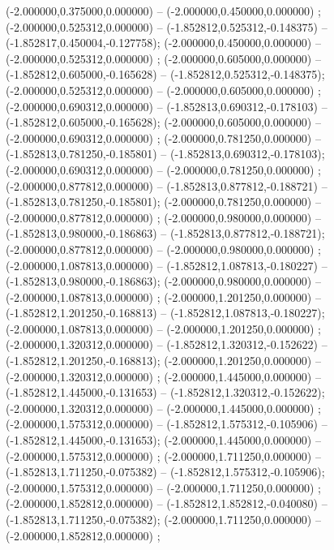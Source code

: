  (-2.000000,0.375000,0.000000) -- (-2.000000,0.450000,0.000000) ;
 (-2.000000,0.525312,0.000000) -- (-1.852812,0.525312,-0.148375) -- (-1.852817,0.450004,-0.127758);
 (-2.000000,0.450000,0.000000) -- (-2.000000,0.525312,0.000000) ;
 (-2.000000,0.605000,0.000000) -- (-1.852812,0.605000,-0.165628) -- (-1.852812,0.525312,-0.148375);
 (-2.000000,0.525312,0.000000) -- (-2.000000,0.605000,0.000000) ;
 (-2.000000,0.690312,0.000000) -- (-1.852813,0.690312,-0.178103) -- (-1.852812,0.605000,-0.165628);
 (-2.000000,0.605000,0.000000) -- (-2.000000,0.690312,0.000000) ;
 (-2.000000,0.781250,0.000000) -- (-1.852813,0.781250,-0.185801) -- (-1.852813,0.690312,-0.178103);
 (-2.000000,0.690312,0.000000) -- (-2.000000,0.781250,0.000000) ;
 (-2.000000,0.877812,0.000000) -- (-1.852813,0.877812,-0.188721) -- (-1.852813,0.781250,-0.185801);
 (-2.000000,0.781250,0.000000) -- (-2.000000,0.877812,0.000000) ;
 (-2.000000,0.980000,0.000000) -- (-1.852813,0.980000,-0.186863) -- (-1.852813,0.877812,-0.188721);
 (-2.000000,0.877812,0.000000) -- (-2.000000,0.980000,0.000000) ;
 (-2.000000,1.087813,0.000000) -- (-1.852812,1.087813,-0.180227) -- (-1.852813,0.980000,-0.186863);
 (-2.000000,0.980000,0.000000) -- (-2.000000,1.087813,0.000000) ;
 (-2.000000,1.201250,0.000000) -- (-1.852812,1.201250,-0.168813) -- (-1.852812,1.087813,-0.180227);
 (-2.000000,1.087813,0.000000) -- (-2.000000,1.201250,0.000000) ;
 (-2.000000,1.320312,0.000000) -- (-1.852812,1.320312,-0.152622) -- (-1.852812,1.201250,-0.168813);
 (-2.000000,1.201250,0.000000) -- (-2.000000,1.320312,0.000000) ;
 (-2.000000,1.445000,0.000000) -- (-1.852812,1.445000,-0.131653) -- (-1.852812,1.320312,-0.152622);
 (-2.000000,1.320312,0.000000) -- (-2.000000,1.445000,0.000000) ;
 (-2.000000,1.575312,0.000000) -- (-1.852812,1.575312,-0.105906) -- (-1.852812,1.445000,-0.131653);
 (-2.000000,1.445000,0.000000) -- (-2.000000,1.575312,0.000000) ;
 (-2.000000,1.711250,0.000000) -- (-1.852813,1.711250,-0.075382) -- (-1.852812,1.575312,-0.105906);
 (-2.000000,1.575312,0.000000) -- (-2.000000,1.711250,0.000000) ;
 (-2.000000,1.852812,0.000000) -- (-1.852812,1.852812,-0.040080) -- (-1.852813,1.711250,-0.075382);
 (-2.000000,1.711250,0.000000) -- (-2.000000,1.852812,0.000000) ;
